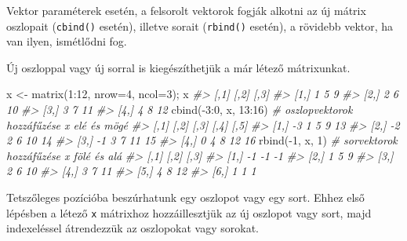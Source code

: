 \documentclass[
]{book}
\newenvironment{Shaded}{\begin{snugshade}}{\end{snugshade}}
\newcommand{\AttributeTok}[1]{\textcolor[rgb]{0.77,0.63,0.00}{#1}}
\newcommand{\CommentTok}[1]{\textcolor[rgb]{0.56,0.35,0.01}{\textit{#1}}}
\newcommand{\DecValTok}[1]{\textcolor[rgb]{0.00,0.00,0.81}{#1}}
\newcommand{\FunctionTok}[1]{\textcolor[rgb]{0.00,0.00,0.00}{#1}}
\newcommand{\NormalTok}[1]{#1}
\newcommand{\OtherTok}[1]{\textcolor[rgb]{0.56,0.35,0.01}{#1}}
\newcommand{\SpecialCharTok}[1]{\textcolor[rgb]{0.00,0.00,0.00}{#1}}
\begin{document}
Vektor paraméterek esetén, a felsorolt vektorok fogják alkotni az új mátrix oszlopait (\texttt{cbind()} esetén), illetve sorait (\texttt{rbind()} esetén), a rövidebb vektor, ha van ilyen, ismétlődni fog.

Új oszloppal vagy új sorral is kiegészíthetjük a már létező mátrixunkat.

\begin{Shaded}
\begin{Highlighting}[]
\NormalTok{x }\OtherTok{\textless{}{-}} \FunctionTok{matrix}\NormalTok{(}\DecValTok{1}\SpecialCharTok{:}\DecValTok{12}\NormalTok{, }\AttributeTok{nrow=}\DecValTok{4}\NormalTok{, }\AttributeTok{ncol=}\DecValTok{3}\NormalTok{); x}
\CommentTok{\#\textgreater{}      [,1] [,2] [,3]}
\CommentTok{\#\textgreater{} [1,]    1    5    9}
\CommentTok{\#\textgreater{} [2,]    2    6   10}
\CommentTok{\#\textgreater{} [3,]    3    7   11}
\CommentTok{\#\textgreater{} [4,]    4    8   12}
\FunctionTok{cbind}\NormalTok{(}\SpecialCharTok{{-}}\DecValTok{3}\SpecialCharTok{:}\DecValTok{0}\NormalTok{, x, }\DecValTok{13}\SpecialCharTok{:}\DecValTok{16}\NormalTok{)  }\CommentTok{\# oszlopvektorok hozzáfűzése x elé és mögé}
\CommentTok{\#\textgreater{}      [,1] [,2] [,3] [,4] [,5]}
\CommentTok{\#\textgreater{} [1,]   {-}3    1    5    9   13}
\CommentTok{\#\textgreater{} [2,]   {-}2    2    6   10   14}
\CommentTok{\#\textgreater{} [3,]   {-}1    3    7   11   15}
\CommentTok{\#\textgreater{} [4,]    0    4    8   12   16}
\FunctionTok{rbind}\NormalTok{(}\SpecialCharTok{{-}}\DecValTok{1}\NormalTok{, x, }\DecValTok{1}\NormalTok{)        }\CommentTok{\# sorvektorok hozzáfűzése x fölé és alá      }
\CommentTok{\#\textgreater{}      [,1] [,2] [,3]}
\CommentTok{\#\textgreater{} [1,]   {-}1   {-}1   {-}1}
\CommentTok{\#\textgreater{} [2,]    1    5    9}
\CommentTok{\#\textgreater{} [3,]    2    6   10}
\CommentTok{\#\textgreater{} [4,]    3    7   11}
\CommentTok{\#\textgreater{} [5,]    4    8   12}
\CommentTok{\#\textgreater{} [6,]    1    1    1}
\end{Highlighting}
\end{Shaded}

Tetszőleges pozícióba beszúrhatunk egy oszlopot vagy egy sort. Ehhez első lépésben a létező \texttt{x} mátrixhoz hozzáillesztjük az új oszlopot vagy sort, majd indexeléssel átrendezzük az oszlopokat vagy sorokat.
\end{document}

